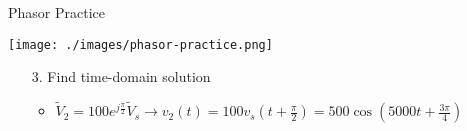     \begin{frame}{Phasor Practice}
        \begin{center}
            \texttt{[image: ./images/phasor-practice.png]}
        \end{center}
        \begin{enumerate}
            \item[3.] Find time-domain solution
            \begin{itemize}
                \item $\tilde{V}_2=100e^{j\frac{\pi}{2}}\tilde{V}_s\rightarrow v_2(t)=100v_s(t+\frac{\pi}{2})=500\cos(5000t+\frac{3\pi}{4})$
            \end{itemize}
        \end{enumerate}
    \end{frame}
	
